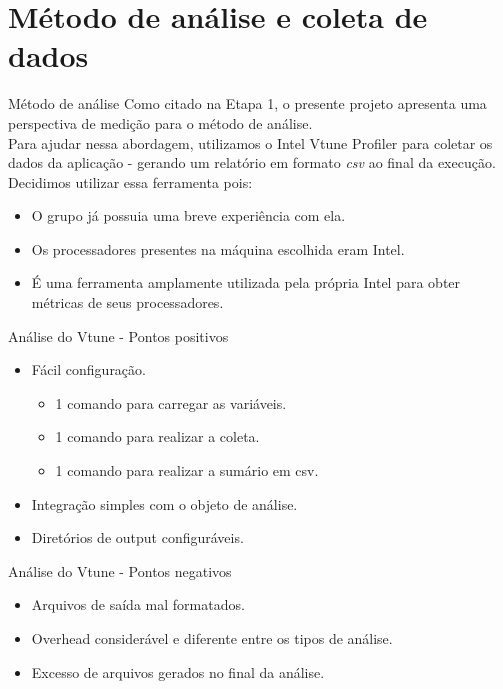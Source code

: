 \documentclass{beamer}
\begin{document}
\section{Método de análise e coleta de dados}
\begin{frame}{Método de análise}
    Como citado na Etapa 1, o presente projeto apresenta uma perspectiva de medição para o método de análise.\\
    \vspace{0.5em}
    Para ajudar nessa abordagem, utilizamos o Intel Vtune Profiler para coletar os dados da aplicação - gerando um relatório em formato \textit{csv} ao final da execução. Decidimos utilizar essa ferramenta pois:
    \vspace{0.5em}
    \begin{itemize}
        \item O grupo já possuia uma breve experiência com ela.
        \item Os processadores presentes na máquina escolhida eram Intel.
        \item É uma ferramenta amplamente utilizada pela própria Intel para obter métricas de seus processadores.
    \end{itemize}
\end{frame}
\begin{frame}{Análise do Vtune - Pontos positivos}
        \begin{itemize}
        \item Fácil configuração.
            \begin{itemize}
                \item 1 comando para carregar as variáveis.
                \item 1 comando para realizar a coleta.
                \item 1 comando para realizar a sumário em csv.
            \end{itemize}
        \vspace{0.5em}
        \item Integração simples com o objeto de análise.
        \vspace{0.5em}
        \item Diretórios de output configuráveis.
    \end{itemize}
\end{frame}
\begin{frame}{Análise do Vtune - Pontos negativos}
        \begin{itemize}
        \item Arquivos de saída mal formatados.
        \vspace{0.5em}
        \item Overhead considerável e diferente entre os tipos de análise.
        \vspace{0.5em}
        \item Excesso de arquivos gerados no final da análise.
    \end{itemize}

\end{frame}
\end{document}
